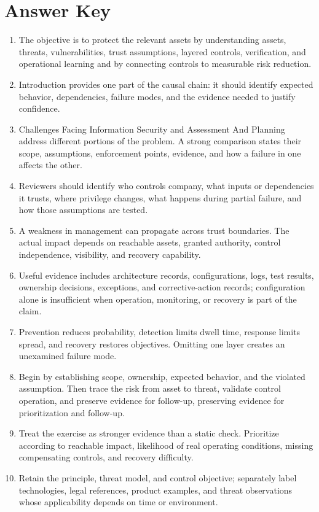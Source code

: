 \documentclass[11pt]{article}
\begin{document}
\section*{Answer Key}
\begin{enumerate}
\item The objective is to protect the relevant assets by understanding assets, threats, vulnerabilities, trust assumptions, layered controls, verification, and operational learning and by connecting controls to measurable risk reduction.
\item Introduction provides one part of the causal chain: it should identify expected behavior, dependencies, failure modes, and the evidence needed to justify confidence.
\item Challenges Facing Information Security and Assessment And Planning address different portions of the problem. A strong comparison states their scope, assumptions, enforcement points, evidence, and how a failure in one affects the other.
\item Reviewers should identify who controls company, what inputs or dependencies it trusts, where privilege changes, what happens during partial failure, and how those assumptions are tested.
\item A weakness in management can propagate across trust boundaries. The actual impact depends on reachable assets, granted authority, control independence, visibility, and recovery capability.
\item Useful evidence includes architecture records, configurations, logs, test results, ownership decisions, exceptions, and corrective-action records; configuration alone is insufficient when operation, monitoring, or recovery is part of the claim.
\item Prevention reduces probability, detection limits dwell time, response limits spread, and recovery restores objectives. Omitting one layer creates an unexamined failure mode.
\item Begin by establishing scope, ownership, expected behavior, and the violated assumption. Then trace the risk from asset to threat, validate control operation, and preserve evidence for follow-up, preserving evidence for prioritization and follow-up.
\item Treat the exercise as stronger evidence than a static check. Prioritize according to reachable impact, likelihood of real operating conditions, missing compensating controls, and recovery difficulty.
\item Retain the principle, threat model, and control objective; separately label technologies, legal references, product examples, and threat observations whose applicability depends on time or environment.
\end{enumerate}
\end{document}
